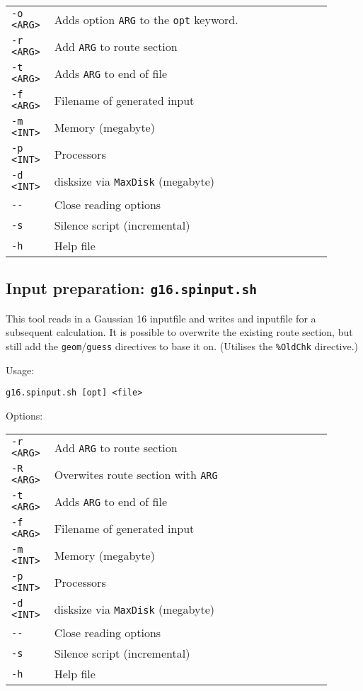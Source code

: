 \documentclass[   %
  final,          %
  a4paper         %
]{article}
\begin{document}
\begin{tabular}{p{0.1\linewidth}p{0.8\linewidth}}
  {\lstinline`-o <ARG>`} & Adds option {\lstinline`ARG`} to the \texttt{opt} keyword. \\
  {\lstinline`-r <ARG>`} & Add {\lstinline`ARG`} to route section \\
  {\lstinline`-t <ARG>`} & Adds {\lstinline`ARG`} to end of file \\
  {\lstinline`-f <ARG>`} & Filename of generated input \\
  {\lstinline`-m <INT>`} & Memory (megabyte) \\
  {\lstinline`-p <INT>`} & Processors \\
  {\lstinline`-d <INT>`} & disksize via \texttt{MaxDisk} (megabyte) \\
  {\lstinline`--`}       & Close reading options \\
  {\lstinline`-s`}       & Silence script (incremental) \\
  {\lstinline`-h`}       & Help file  \\
\end{tabular}

\subsection{Input preparation: \texorpdfstring{{\lstinline`g16.spinput.sh`}}{g16.spinput.sh}}

This tool reads in a Gaussian 16 inputfile and 
writes and inputfile for a subsequent calculation.
It is possible to overwrite the existing route section, but still
add the \texttt{geom}/\texttt{guess} directives to base it on.
(Utilises the \texttt{\%OldChk} directive.)

Usage: 

\lstinline`g16.spinput.sh [opt] <file>`

Options:

\begin{tabular}{p{0.1\linewidth}p{0.8\linewidth}}
  {\lstinline`-r <ARG>`} & Add {\lstinline`ARG`} to route section \\
  {\lstinline`-R <ARG>`} & Overwites route section with {\lstinline`ARG`} \\
  {\lstinline`-t <ARG>`} & Adds {\lstinline`ARG`} to end of file \\
  {\lstinline`-f <ARG>`} & Filename of generated input \\
  {\lstinline`-m <INT>`} & Memory (megabyte) \\
  {\lstinline`-p <INT>`} & Processors \\
  {\lstinline`-d <INT>`} & disksize via \texttt{MaxDisk} (megabyte) \\
  {\lstinline`--`}       & Close reading options \\
  {\lstinline`-s`}       & Silence script (incremental) \\
  {\lstinline`-h`}       & Help file  \\
\end{tabular}
\end{document}
